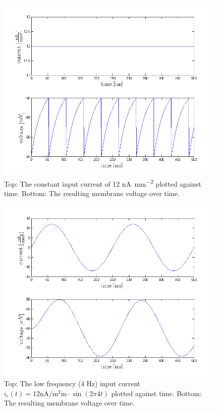\documentclass{scrartcl}
\begin{document}
\begin{figure}
\centering
\includegraphics[trim = {1.1cm 0 1.7cm 1.1cm}, width=\textwidth, clip]{../pics/constant}
\caption{Top: The constant input current of 12 \si{\nano\ampere\per\square\milli\meter} plotted against time. Bottom: The resulting membrane voltage over time.}
\label{constant}
\end{figure}

\begin{figure}
\centering
\includegraphics[trim = {1.1cm 0 1.7cm 1.1cm}, width=\textwidth, clip]{../pics/low}
\caption{Top: The low frequency (4 \si{Hz}) input current $i_e(t) = 12 \si{\nano\ampere\per\square\milli\meter} \cdot \sin{(2\pi4t)}$ plotted against time. Bottom: The resulting membrane voltage over time.}
\label{low}
\end{figure}
\end{document}
